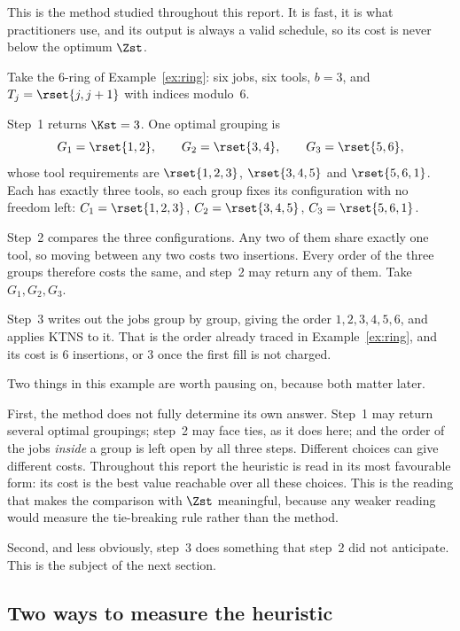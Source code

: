 This is the method studied throughout this report. It is fast, it is what
practitioners use, and its output is always a valid schedule, so its cost is
never below the optimum $\Zst$.

\begin{example}\label{ex:jgp-ring}
Take the $6$-ring of Example~\ref{ex:ring}: six jobs, six tools, $b=3$, and
$T_j = \rset{j, j+1}$ with indices modulo~$6$.

Step~1 returns $\Kst = 3$. One optimal grouping is
\[
  G_1 = \rset{1,2}, \qquad G_2 = \rset{3,4}, \qquad G_3 = \rset{5,6},
\]
whose tool requirements are $\rset{1,2,3}$, $\rset{3,4,5}$ and $\rset{5,6,1}$.
Each has exactly three tools, so each group fixes its configuration with no
freedom left: $C_1 = \rset{1,2,3}$, $C_2 = \rset{3,4,5}$, $C_3 = \rset{5,6,1}$.

Step~2 compares the three configurations. Any two of them share exactly one
tool, so moving between any two costs two insertions. Every order of the three
groups therefore costs the same, and step~2 may return any of them. Take
$G_1, G_2, G_3$.

Step~3 writes out the jobs group by group, giving the order $1,2,3,4,5,6$, and
applies KTNS to it. That is the order already traced in Example~\ref{ex:ring},
and its cost is $6$ insertions, or $3$ once the first fill is not charged.
\end{example}

Two things in this example are worth pausing on, because both matter later.

First, the method does not fully determine its own answer. Step~1 may return
several optimal groupings; step~2 may face ties, as it does here; and the order
of the jobs \emph{inside} a group is left open by all three steps. Different
choices can give different costs. Throughout this report the heuristic is read
in its most favourable form: its cost is the best value reachable over all these
choices. This is the reading that makes the comparison with $\Zst$ meaningful,
because any weaker reading would measure the tie-breaking rule rather than the
method.

Second, and less obviously, step~3 does something that step~2 did not
anticipate. This is the subject of the next section.

\subsection{Two ways to measure the heuristic}\label{ssec:frames}

